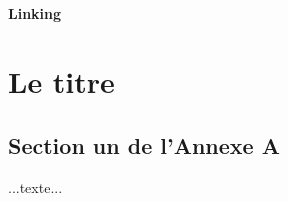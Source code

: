 \documentclass[12pt,twoside,maitrise]{dms}
\theoremstyle{definition}
\begin{document}
\subsubsection{Linking}





\def\bibname{References}


\appendix
\chapter{Le titre}

\section{Section un de l'Annexe A}

...texte...
\end{document}
